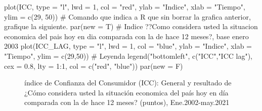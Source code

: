 \documentclass[
  a4paper,
]{article}
\newenvironment{Shaded}{}{}
\newcommand{\AttributeTok}[1]{\textcolor[rgb]{0.84,0.23,0.29}{#1}}
\newcommand{\CommentTok}[1]{\textcolor[rgb]{0.42,0.45,0.49}{#1}}
\newcommand{\DecValTok}[1]{\textcolor[rgb]{0.00,0.36,0.77}{#1}}
\newcommand{\FloatTok}[1]{\textcolor[rgb]{0.00,0.36,0.77}{#1}}
\newcommand{\FunctionTok}[1]{\textcolor[rgb]{0.44,0.26,0.76}{#1}}
\newcommand{\NormalTok}[1]{\textcolor[rgb]{0.14,0.16,0.18}{#1}}
\newcommand{\SpecialCharTok}[1]{\textcolor[rgb]{0.00,0.36,0.77}{#1}}
\newcommand{\StringTok}[1]{\textcolor[rgb]{0.01,0.18,0.38}{#1}}
\begin{document}
\begin{Shaded}
\begin{Highlighting}[]
\FunctionTok{plot}\NormalTok{(ICC, }\AttributeTok{type =} \StringTok{"l"}\NormalTok{, }\AttributeTok{lwd =} \DecValTok{1}\NormalTok{, }\AttributeTok{col =} \StringTok{"red"}\NormalTok{, }\AttributeTok{ylab =} \StringTok{"Indice"}\NormalTok{, }\AttributeTok{xlab =} \StringTok{"Tiempo"}\NormalTok{, }\AttributeTok{ylim =} \FunctionTok{c}\NormalTok{(}\DecValTok{29}\NormalTok{, }\DecValTok{50}\NormalTok{))}
\CommentTok{\# Comando que indica a R que sin borrar la grafica anterior, grafique la siguiente.}
\FunctionTok{par}\NormalTok{(}\AttributeTok{new =}\NormalTok{ T)}
\CommentTok{\# Indice ??Como considera usted la situacion economica del pais hoy en dia comparada con la de hace 12 meses?, base enero 2003}
\FunctionTok{plot}\NormalTok{(ICC\_LAG, }\AttributeTok{type =} \StringTok{"l"}\NormalTok{, }\AttributeTok{lwd =} \DecValTok{1}\NormalTok{, }\AttributeTok{col =} \StringTok{"blue"}\NormalTok{, }\AttributeTok{ylab =} \StringTok{"Indice"}\NormalTok{, }\AttributeTok{xlab =} \StringTok{"Tiempo"}\NormalTok{, }\AttributeTok{ylim =} \FunctionTok{c}\NormalTok{(}\DecValTok{29}\NormalTok{,}\DecValTok{50}\NormalTok{))}
\CommentTok{\# Leyenda}
\FunctionTok{legend}\NormalTok{(}\StringTok{"bottomleft"}\NormalTok{, }\FunctionTok{c}\NormalTok{(}\StringTok{"ICC"}\NormalTok{,}\StringTok{"ICC lag"}\NormalTok{), }\AttributeTok{cex =} \FloatTok{0.8}\NormalTok{, }\AttributeTok{lty =} \DecValTok{1}\SpecialCharTok{:}\DecValTok{1}\NormalTok{, }\AttributeTok{col =} \FunctionTok{c}\NormalTok{(}\StringTok{"red"}\NormalTok{, }\StringTok{"blue"}\NormalTok{))}
\FunctionTok{par}\NormalTok{(}\AttributeTok{new =}\NormalTok{ F)}
\end{Highlighting}
\end{Shaded}

\begin{figure}[H]

\caption{\label{fig-fig2}índice de Confianza del Consumidor (ICC):
General y resultado de ¿Cómo considera usted la situación economica del
país hoy en día comparada con la de hace 12 meses? (puntos),
Ene.2002-may.2021}


\end{figure}%
\end{document}
